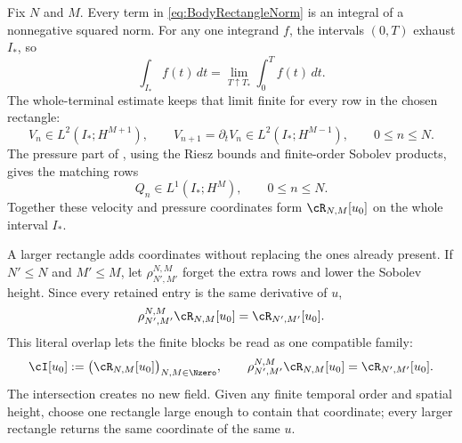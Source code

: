 Fix \(N\) and \(M\).
Every term in \eqref{eq:BodyRectangleNorm} is an integral of a nonnegative squared norm.
For any one integrand \(f\), the intervals \((0,T)\) exhaust \(I_*\), so
\[
  \int_{I_*}f(t)\,dt
  =
  \lim_{T\uparrow T_*}\int_0^T f(t)\,dt.
\]
The whole-terminal estimate keeps that limit finite for every row in the chosen rectangle:
\begin{equation}\label{eq:BodyWholeTerminalAdjacentRows}
  V_n\in L^2(I_*;H^{M+1}),
  \qquad
  V_{n+1}=\partial_tV_n\in L^2(I_*;H^{M-1}),
  \qquad 0\leq n\leq N.
\end{equation}
The pressure part of
, using the Riesz bounds and
finite-order Sobolev products, gives the matching rows
\begin{equation}\label{eq:BodyWholeTerminalPressureRows}
  Q_n\in L^1(I_*;H^M),
  \qquad 0\leq n\leq N.
\end{equation}
Together these velocity and pressure coordinates form \(\cR_{N,M}[u_0]\) on the whole interval \(I_*\).

A larger rectangle adds coordinates without replacing the ones already present.
If \(N'\leq N\) and \(M'\leq M\), let \(\rho_{N',M'}^{N,M}\) forget the extra rows and lower the Sobolev height.  Since every retained entry is the same derivative of \(u\),
\begin{equation}\label{eq:BodyRectangleRestrictionCompatibility}
  \rho_{N',M'}^{N,M}\cR_{N,M}[u_0]
  =\cR_{N',M'}[u_0].
\end{equation}
This literal overlap lets the finite blocks be read as one compatible family:
\begin{equation}\label{eq:DatumSpecificCompatibleIntersection}
  \cI[u_0]
  :=\bigl(\cR_{N,M}[u_0]\bigr)_{N,M\in\Nzero},
  \qquad
  \rho_{N',M'}^{N,M}\cR_{N,M}[u_0]
  =\cR_{N',M'}[u_0].
\end{equation}
The intersection creates no new field.
Given any finite temporal order and spatial height, choose one rectangle large enough to contain that coordinate; every larger rectangle returns the same coordinate of the same \(u\).


